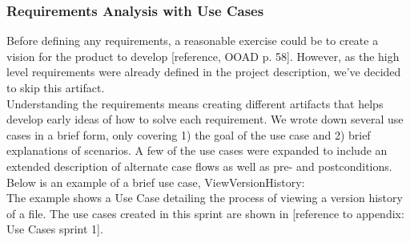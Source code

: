 \subsubsection{Requirements Analysis with Use Cases}
Before defining any requirements, a reasonable exercise could be to create a vision for the product to develop [reference, OOAD p. 58]. However, as the high level requirements were already defined in the project description, we’ve decided to skip this artifact.\\
\newline
Understanding the requirements means creating different artifacts that helps develop early ideas of how to solve each requirement. We wrote down several use cases in a brief form, only covering 1) the goal of the use case and 2) brief explanations of scenarios. A few of the use cases were expanded to include an extended description of alternate case flows as well as pre- and postconditions. Below is an example of a brief use case, ViewVersionHistory:\\
The example shows a Use Case detailing the process of viewing a version history of a file.
The use cases created in this sprint are shown in [reference to appendix: Use Cases sprint 1].\\
